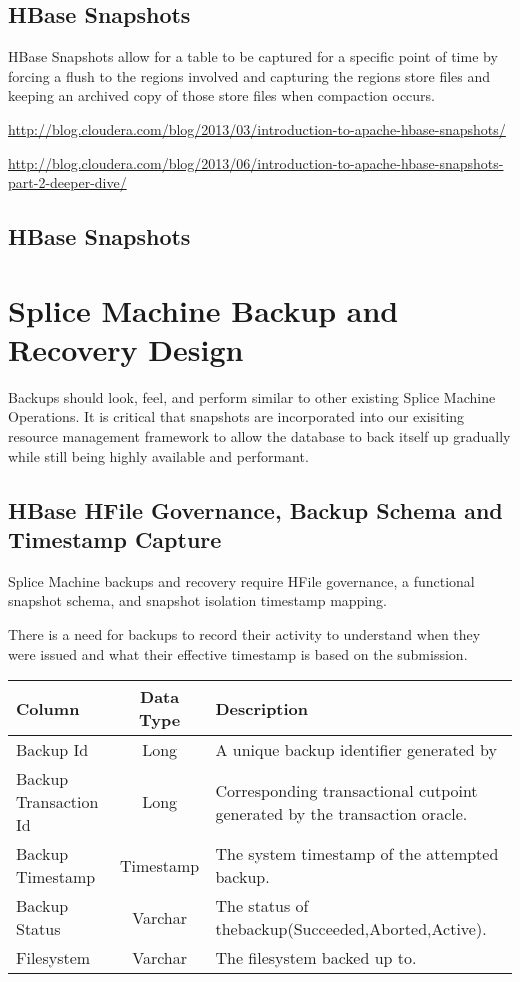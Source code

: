 \subsection{HBase Snapshots}

HBase Snapshots allow for a table to be captured for a specific point of time
by forcing a flush to the regions involved and capturing the regions store
files and keeping an archived copy of those store files when compaction occurs. 

\url{http://blog.cloudera.com/blog/2013/03/introduction-to-apache-hbase-snapshots/}

\url{http://blog.cloudera.com/blog/2013/06/introduction-to-apache-hbase-snapshots-part-2-deeper-dive/}

\subsection{HBase Snapshots}

\section{Splice Machine Backup and Recovery Design}

Backups should look, feel, and perform similar to other existing Splice Machine
Operations.  It is critical that snapshots are incorporated into our exisiting
resource management framework to allow the database to back itself up gradually
while still being highly available and performant.

\subsection{HBase HFile Governance, Backup Schema and Timestamp Capture}

Splice Machine backups and recovery require HFile governance, a functional
snapshot schema, and snapshot isolation timestamp mapping.

There is a need for backups to record their activity to understand when they
were issued and what their effective timestamp is based on the submission.
 
\begin{center}
\begin{tabular}{|l|c|p{5cm}|}
				\hline
				\bf{Column}							&	\bf{Data Type}	&	\bf{Description} \\ \hline
				Backup Id							&	Long			&	A unique backup identifier generated by \\ \hline 
				Backup Transaction Id				& 	Long			& 	Corresponding
				transactional cutpoint generated by the transaction oracle. \\ \hline 
				Backup Timestamp				   &	Timestamp		&	The system timestamp of
				the attempted backup.
				\\
				\hline 
				Backup Status						&	Varchar			& 	The status of
				thebackup(Succeeded,Aborted,Active).
				\\
				\hline
				Filesystem						&	Varchar			& 	The filesystem backed up to.
				\\
				\hline

\end{tabular}
\end{center}


